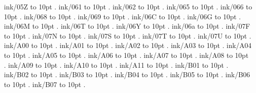ink/05Z \leaders\hbox to 10pt {\hss.\hss}  \hfill {}
\smallskip
ink/061 \leaders\hbox to 10pt {\hss.\hss}  \hfill {}
\smallskip
ink/062 \leaders\hbox to 10pt {\hss.\hss}  \hfill {}
\smallskip
ink/065 \leaders\hbox to 10pt {\hss.\hss}  \hfill {}
\smallskip
ink/066 \leaders\hbox to 10pt {\hss.\hss}  \hfill {}
\smallskip
ink/068 \leaders\hbox to 10pt {\hss.\hss}  \hfill {}
\smallskip
ink/069 \leaders\hbox to 10pt {\hss.\hss}  \hfill {}
\smallskip
ink/06C \leaders\hbox to 10pt {\hss.\hss}  \hfill {}
\smallskip
ink/06G \leaders\hbox to 10pt {\hss.\hss}  \hfill {}
\smallskip
ink/06M \leaders\hbox to 10pt {\hss.\hss}  \hfill {}
\smallskip
ink/06T \leaders\hbox to 10pt {\hss.\hss}  \hfill {}
\smallskip
ink/06Y \leaders\hbox to 10pt {\hss.\hss}  \hfill {}
\smallskip
ink/06a \leaders\hbox to 10pt {\hss.\hss}  \hfill {}
\smallskip
ink/07F \leaders\hbox to 10pt {\hss.\hss}  \hfill {}
\smallskip
ink/07N \leaders\hbox to 10pt {\hss.\hss}  \hfill {}
\smallskip
ink/07S \leaders\hbox to 10pt {\hss.\hss}  \hfill {}
\smallskip
ink/07T \leaders\hbox to 10pt {\hss.\hss}  \hfill {}
\smallskip
ink/07U \leaders\hbox to 10pt {\hss.\hss}  \hfill {}
\smallskip
ink/A00 \leaders\hbox to 10pt {\hss.\hss}  \hfill {}
\smallskip
ink/A01 \leaders\hbox to 10pt {\hss.\hss}  \hfill {}
\smallskip
ink/A02 \leaders\hbox to 10pt {\hss.\hss}  \hfill {}
\smallskip
ink/A03 \leaders\hbox to 10pt {\hss.\hss}  \hfill {}
\smallskip
ink/A04 \leaders\hbox to 10pt {\hss.\hss}  \hfill {}
\smallskip
ink/A05 \leaders\hbox to 10pt {\hss.\hss}  \hfill {}
\smallskip
ink/A06 \leaders\hbox to 10pt {\hss.\hss}  \hfill {}
\smallskip
ink/A07 \leaders\hbox to 10pt {\hss.\hss}  \hfill {}
\smallskip
ink/A08 \leaders\hbox to 10pt {\hss.\hss}  \hfill {}
\smallskip
ink/A09 \leaders\hbox to 10pt {\hss.\hss}  \hfill {}
\smallskip
ink/A10 \leaders\hbox to 10pt {\hss.\hss}  \hfill {}
\smallskip
ink/A11 \leaders\hbox to 10pt {\hss.\hss}  \hfill {}
\smallskip
ink/B01 \leaders\hbox to 10pt {\hss.\hss}  \hfill {}
\smallskip
ink/B02 \leaders\hbox to 10pt {\hss.\hss}  \hfill {}
\smallskip
ink/B03 \leaders\hbox to 10pt {\hss.\hss}  \hfill {}
\smallskip
ink/B04 \leaders\hbox to 10pt {\hss.\hss}  \hfill {}
\smallskip
ink/B05 \leaders\hbox to 10pt {\hss.\hss}  \hfill {}
\smallskip
ink/B06 \leaders\hbox to 10pt {\hss.\hss}  \hfill {}
\smallskip
ink/B07 \leaders\hbox to 10pt {\hss.\hss}  \hfill {}
